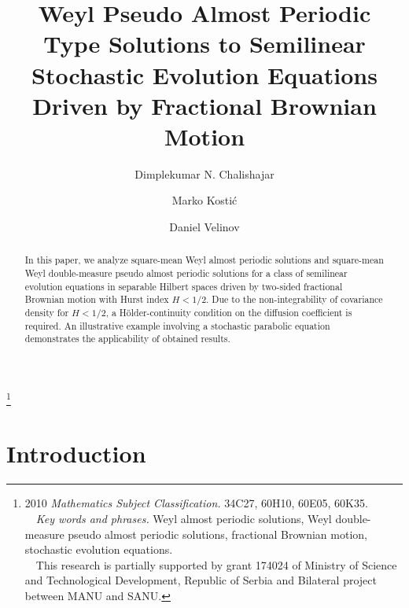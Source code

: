 \documentclass[11pt]{amsart}
\begin{document}
\title[Weyl Pseudo Almost Periodic Type Solutions to SSEEs driven by fBm]{Weyl Pseudo Almost Periodic Type Solutions to Semilinear Stochastic Evolution Equations Driven by Fractional Brownian Motion}

\author{Dimplekumar N. Chalishajar}
\address{Carroll Hall, Virginia Military Institute (VMI), VA-24450, USA}

\author{Marko Kosti\' c}
\address{Faculty of Technical Sciences,
University of Novi Sad,
Trg D. Obradovi\' ca 6, 21125 Novi Sad, Serbia}

\author{Daniel Velinov}
\address{Department for Mathematics and Informatics, Faculty of Civil Engineering, Ss. Cyril and Methodius University in Skopje,
Partizanski Odredi
24, P.O. box 560, 1000 Skopje, N. Macedonia}

{\renewcommand{\thefootnote}{} \footnote{2010 {\it Mathematics
Subject Classification.} 34C27, 60H10, 60E05, 60K35.
\\ \text{  }  \ \    {\it Key words and phrases.} Weyl almost periodic solutions, Weyl double-measure pseudo almost periodic solutions, fractional Brownian motion, stochastic evolution equations.
\\  \text{  }  \ \ This research is partially supported by grant 174024 of Ministry of Science and Technological Development, Republic of Serbia and Bilateral project between MANU and SANU.}}


\maketitle

\begin{abstract} 
In this paper, we analyze square-mean Weyl almost periodic solutions and square-mean Weyl double-measure pseudo almost periodic solutions for a class of semilinear evolution equations in separable Hilbert spaces driven by two-sided fractional Brownian motion with Hurst index $H<1/2$. Due to the non-integrability of covariance density for $H<1/2$, a H\"{o}lder-continuity condition on the diffusion coefficient is required. An illustrative example involving a stochastic parabolic equation demonstrates the applicability of obtained results.
\end{abstract}

\section{Introduction}
\end{document}
